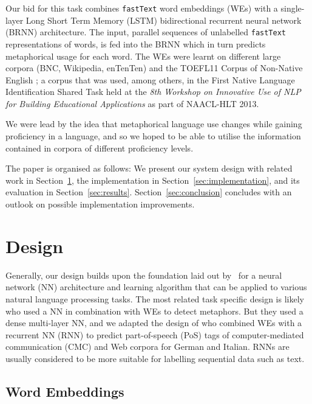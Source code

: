 \documentclass[11pt,a4paper]{article}
\newcommand\fT{\texttt{fastText}\xspace}
\begin{document}
Our bid for this task combines \fT \cite{bojanowski2016enriching} word embeddings (WEs) with a single-layer Long Short Term Memory (LSTM) bidirectional recurrent neural network (BRNN) architecture.
The input, parallel sequences of unlabelled \fT representations of words, is fed into the BRNN which in turn predicts metaphorical usage for each word. 
The WEs were learnt on different large corpora (BNC, Wikipedia, enTenTen) and the TOEFL11 Corpus of Non-Native English \cite{ETS2:ETS202331}; a corpus that was used, among others, in the First Native Language Identification Shared Task \cite{tetreault-blanchard-cahill:2013:BEA} held at the \emph{8th Workshop on Innovative Use of NLP for Building Educational Applications} as part of NAACL-HLT 2013.

We were lead by the idea that metaphorical language use changes while gaining proficiency in a language, and so we hoped to be able to utilise the information contained in corpora of different proficiency levels.

The paper is organised as follows: We present our system design with related work in
Section~\ref{sec:design}, the implementation in
Section~\ref{sec:implementation}, and its evaluation in
Section~\ref{sec:results}. 
Section~\ref{sec:conclusion} concludes with an outlook on possible
implementation improvements.



\section{Design} %
\label{sec:design}

Generally, our design builds upon the foundation laid out by~ for a neural network (NN) architecture and learning algorithm that can be applied to various natural language processing tasks.
The most related task specific design is likely  who used a NN in combination with WEs to detect metaphors. 
But they used a dense multi-layer NN, and we adapted the design of  who combined WEs with a recurrent NN (RNN) to predict part-of-speech (PoS) tags of computer-mediated communication (CMC) and Web corpora for German and Italian.
RNNs are usually considered to be more suitable for labelling sequential data such as text.


\subsection{Word Embeddings} %
\label{subsec:we}
\end{document}
